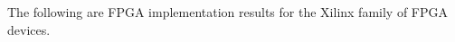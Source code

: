 \label{sec:ir}
The following are FPGA implementation results for the Xilinx family of FPGA devices.

